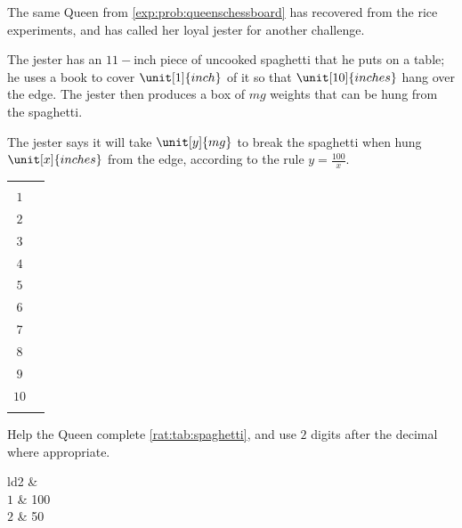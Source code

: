	 \begin{problem}
	 The same Queen from \vref{exp:prob:queenschessboard} has recovered from
	 the rice experiments, and has called her loyal jester for another challenge.

	 The jester has an $11-$inch piece of uncooked spaghetti that he puts on a table;
	 he uses a book to cover $\unit[1]{inch}$ of it so that
	 $\unit[10]{inches}$ hang over the edge. The jester then produces a box of $\unit{mg}$
	 weights that can be hung from the spaghetti.

	 The jester says it will take $\unit[y]{mg}$ to break the spaghetti when hung
	 $\unit[x]{inches}$ from the edge, according to the rule $y=\frac{100}{x}$.
	 \begin{margintable}
		 \centering
		 \label{rat:tab:spaghetti}
		 \begin{tabular}{cc}
			 \beforeheading
			 \heading{$x$} & \heading{$y$} \\
			 \afterheading
			 $1$           &               \\\normalline
			 $2$           &               \\\normalline
			 $3$           &               \\\normalline
			 $4$           &               \\\normalline
			 $5$           &               \\\normalline
			 $6$           &               \\\normalline
			 $7$           &               \\\normalline
			 $8$           &               \\\normalline
			 $9$           &               \\\normalline
			 $10$          &               \\\lastline
		 \end{tabular}
	 \end{margintable}
	 \begin{subproblem}\label{rat:prob:spaggt1}
		 Help the Queen complete \cref{rat:tab:spaghetti}, and use $2$ digits after the decimal
		 where appropriate.
		 \begin{shortsolution}
			 \begin{tabular}[t]{ld{2}}
				 \beforeheading
				  & \heading{$y$} \\
				 \afterheading
				 $1$           & 100           \\\normalline
				 $2$           & 50            \\\normalline

\end{tabular}
\end{shortsolution}
\end{subproblem}
\end{problem}
